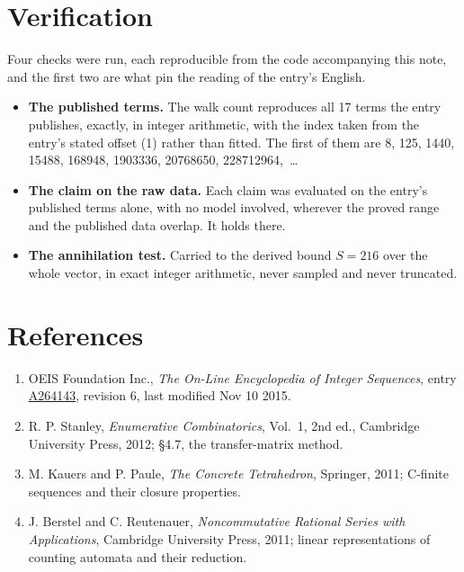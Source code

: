 \documentclass[11pt]{article}
\theoremstyle{definition}
\begin{document}
\section{Verification}

Four checks were run, each reproducible from the code accompanying this note, and the first two are what pin the reading of the entry's English.

\begin{itemize}

\item {\bfseries The published terms.} The walk count reproduces all 17 terms the entry publishes, exactly, in integer arithmetic, with the index taken from the entry's stated offset (1) rather than fitted. The first of them are 8, 125, 1440, 15488, 168948, 1903336, 20768650, 228712964,~\dots

\item {\bfseries The claim on the raw data.} Each claim was evaluated on the entry's published terms alone, with no model involved, wherever the proved range and the published data overlap. It holds there.

\item {\bfseries The annihilation test.} Carried to the derived bound $S = 216$ over the whole vector, in exact integer arithmetic, never sampled and never truncated.

\end{itemize}

\section{References}

\begin{enumerate}

\item OEIS Foundation Inc., \emph{The On-Line Encyclopedia of Integer Sequences}, entry \href{https://oeis.org/A264143}{A264143}, revision 6, last modified Nov 10 2015.

\item R. P. Stanley, \emph{Enumerative Combinatorics}, Vol.~1, 2nd ed., Cambridge University Press, 2012; \S4.7, the transfer-matrix method.

\item M. Kauers and P. Paule, \emph{The Concrete Tetrahedron}, Springer, 2011; C-finite sequences and their closure properties.

\item J. Berstel and C. Reutenauer, \emph{Noncommutative Rational Series with Applications}, Cambridge University Press, 2011; linear representations of counting automata and their reduction.

\end{enumerate}
\end{document}
